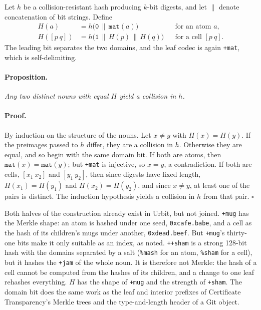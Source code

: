 \documentclass[twoside]{article}
\begin{document}
Let $h$ be a collision-resistant hash producing $k$-bit digests, and let $\|$ denote concatenation of bit strings.  Define
\begin{align*}
H(a)       &= h\big(\texttt{0} \,\|\, \texttt{mat}(a)\big) && \text{for an atom } a, \\
H([p~q])   &= h\big(\texttt{1} \,\|\, H(p) \,\|\, H(q)\big) && \text{for a cell } [p~q].
\end{align*}
The leading bit separates the two domains, and the leaf codec is again \texttt{+mat}, which is self-delimiting.

\paragraph*{Proposition.}
\textit{Any two distinct nouns with equal $H$ yield a collision in $h$.}

\paragraph*{Proof.}
By induction on the structure of the nouns.  Let $x \ne y$ with $H(x) = H(y)$.  If the preimages passed to $h$ differ, they are a collision in $h$.  Otherwise they are equal, and so begin with the same domain bit.  If both are atoms, then $\texttt{mat}(x) = \texttt{mat}(y)$; but \texttt{+mat} is injective, so $x = y$, a contradiction.  If both are cells, $[x_1~x_2]$ and $[y_1~y_2]$, then since digests have fixed length, $H(x_1) = H(y_1)$ and $H(x_2) = H(y_2)$, and since $x \ne y$, at least one of the pairs is distinct.  The induction hypothesis yields a collision in $h$ from that pair. \hfill$\square$

\bigskip
\noindent
Both halves of the construction already exist in Urbit, but not joined.  \lstinline[style=inlinecode]{+mug} has the Merkle shape:  an atom is hashed under one seed, \texttt{0xcafe.babe}, and a cell as the hash of its children's mugs under another, \texttt{0xdead.beef}.  But \texttt{+mug}'s thirty-one bits make it only suitable as an index, as noted.  \lstinline[style=inlinecode]{++sham} is a strong 128-bit hash with the domains separated by a salt (\texttt{\%mash} for an atom, \texttt{\%sham} for a cell), but it hashes the \texttt{+jam} of the whole noun.  It is therefore not Merkle:  the hash of a cell cannot be computed from the hashes of its children, and a change to one leaf rehashes everything.  $H$ has the shape of \lstinline[style=inlinecode]{+mug} and the strength of \lstinline[style=inlinecode]{+sham}.  The domain bit does the same work as the leaf and interior prefixes of Certificate Transparency's Merkle trees \citep{RFC6962} and the type-and-length header of a Git object.
\end{document}
